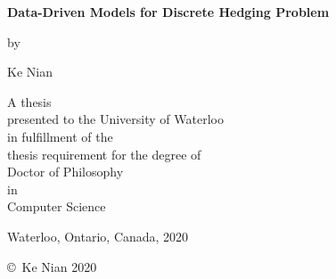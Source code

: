 \pagestyle{empty}

\begin{titlepage}
        \begin{center}
        \vspace*{1.0cm}

        \Huge
        {\bf Data-Driven Models for Discrete Hedging Problem }

        \vspace*{1.0cm}

        \normalsize
        by \\

        \vspace*{1.0cm}

        \Large
        Ke Nian \\

        \vspace*{3.0cm}

        \normalsize
        A thesis \\
        presented to the University of Waterloo \\
        in fulfillment of the \\
        thesis requirement for the degree of \\
        Doctor of Philosophy \\
        in \\
        Computer Science \\

        \vspace*{2.0cm}

        Waterloo, Ontario, Canada, 2020 \\

        \vspace*{1.0cm}

        \copyright\ Ke Nian 2020 \\
        \end{center}
\end{titlepage}

\pagestyle{plain}
\setcounter{page}{2}


